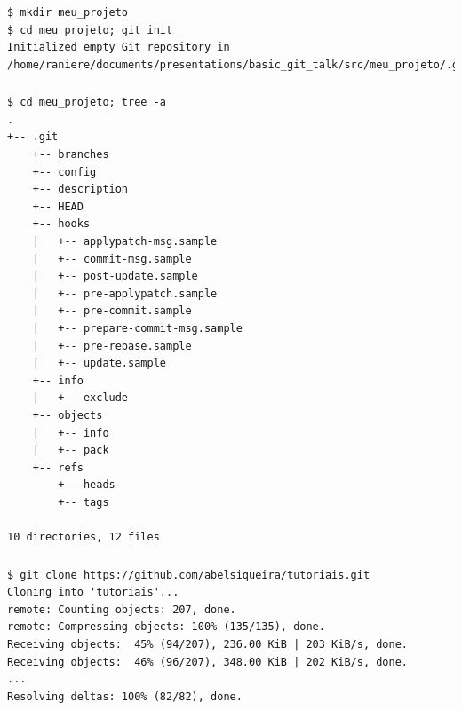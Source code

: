 \documentclass[11pt]{beamer}
\begin{document}

\begin{frame}[fragile]
\frametitle{\mytitle}
    \begin{lstlisting}
$ mkdir meu_projeto
$ cd meu_projeto; git init
Initialized empty Git repository in /home/raniere/documents/presentations/basic_git_talk/src/meu_projeto/.git/
    \end{lstlisting}
\end{frame}

\begin{frame}[fragile]
\frametitle{\mytitle}
    \begin{lstlisting}[basicstyle=\tiny]
$ cd meu_projeto; tree -a
.
+-- .git
    +-- branches
    +-- config
    +-- description
    +-- HEAD
    +-- hooks
    |   +-- applypatch-msg.sample
    |   +-- commit-msg.sample
    |   +-- post-update.sample
    |   +-- pre-applypatch.sample
    |   +-- pre-commit.sample
    |   +-- prepare-commit-msg.sample
    |   +-- pre-rebase.sample
    |   +-- update.sample
    +-- info
    |   +-- exclude
    +-- objects
    |   +-- info
    |   +-- pack
    +-- refs
        +-- heads
        +-- tags

10 directories, 12 files
    \end{lstlisting}
\end{frame}


\begin{frame}[fragile]
\frametitle{\mytitle}
    \begin{lstlisting}
$ git clone https://github.com/abelsiqueira/tutoriais.git
Cloning into 'tutoriais'...
remote: Counting objects: 207, done.
remote: Compressing objects: 100% (135/135), done.
Receiving objects:  45% (94/207), 236.00 KiB | 203 KiB/s, done.
Receiving objects:  46% (96/207), 348.00 KiB | 202 KiB/s, done.
...
Resolving deltas: 100% (82/82), done.
    \end{lstlisting}
\end{frame}



\end{document}
